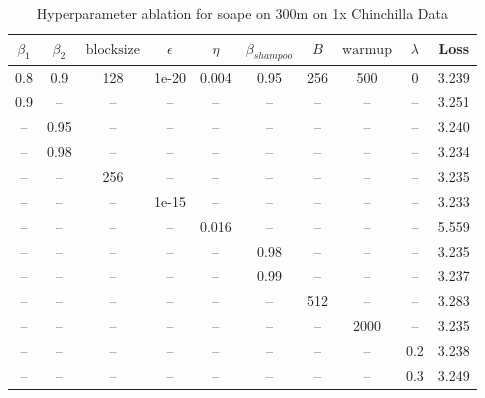 \begin{table}[h!]
\centering
\caption{Hyperparameter ablation for soape on 300m on 1x Chinchilla Data}
\label{tab:ablation_soape_300m_on_1x_chinchilla_data}
\begin{tabular}{cccccccccc}
\toprule
$\beta_1$ & $\beta_2$ & $\mathrm{block size}$ & $\epsilon$ & $\eta$ & $\beta_{shampoo}$ & $B$ & $\mathrm{warmup}$ & $\lambda$ & Loss \\
\midrule
0.8 & 0.9 & 128 & 1e-20 & 0.004 & 0.95 & 256 & 500 & 0 & 3.239 \\
\midrule
0.9 & -- & -- & -- & -- & -- & -- & -- & -- & 3.251 \\
-- & 0.95 & -- & -- & -- & -- & -- & -- & -- & 3.240 \\
-- & 0.98 & -- & -- & -- & -- & -- & -- & -- & 3.234 \\
-- & -- & 256 & -- & -- & -- & -- & -- & -- & 3.235 \\
-- & -- & -- & 1e-15 & -- & -- & -- & -- & -- & 3.233 \\
-- & -- & -- & -- & 0.016 & -- & -- & -- & -- & 5.559 \\
-- & -- & -- & -- & -- & 0.98 & -- & -- & -- & 3.235 \\
-- & -- & -- & -- & -- & 0.99 & -- & -- & -- & 3.237 \\
-- & -- & -- & -- & -- & -- & 512 & -- & -- & 3.283 \\
-- & -- & -- & -- & -- & -- & -- & 2000 & -- & 3.235 \\
-- & -- & -- & -- & -- & -- & -- & -- & 0.2 & 3.238 \\
-- & -- & -- & -- & -- & -- & -- & -- & 0.3 & 3.249 \\
\bottomrule
\end{tabular}
\end{table}

